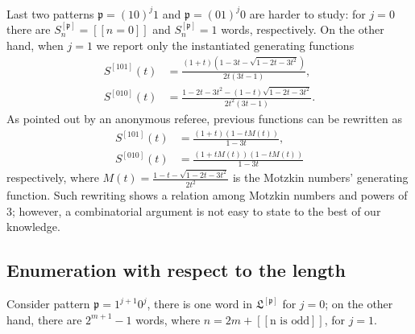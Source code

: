 Last two patterns $\mathfrak{p}=(10)^{j}1$ and $\mathfrak{p}=(01)^{j}0$ are
harder to study: for $j=0$ there are $S_{n}^{[\mathfrak{p}]}=[\![n=0]\!]$ and
$S_{n}^{[\mathfrak{p}]}=1$ words, respectively.  On the other hand, when $j=1$
we report only the instantiated generating functions
\begin{displaymath}
\begin{split}
    S^{[\mathfrak{101}]}(t) &=\frac{(1+t)\left(1-3t-\sqrt{1-2t-3t^{2}}\right)}{2t(3t-1)}, \\
    S^{[\mathfrak{010}]}(t) &=\frac{1-2t-3t^{2}-(1-t)\sqrt{1-2t-3t^{2}}}{2t^{2}(3t-1)}.
\end{split}
\end{displaymath}
As pointed out by an anonymous referee, previous functions can be rewritten as
\begin{displaymath}
\begin{split}
    S^{[\mathfrak{101}]}(t) &=\frac{(1+t)(1- t M(t))}{1-3t},\\
    S^{[\mathfrak{010}]}(t) &=\frac{(1+t M(t))(1-t M(t))}{1-3t}
\end{split}
\end{displaymath}
respectively, where $M(t)=\frac{1 - t - \sqrt{1-2t-3t^{2}} }{2t^{2}}$ is the
Motzkin numbers' generating function. Such rewriting shows a relation among Motzkin numbers
and powers of $3$; however, a combinatorial argument is not easy to state to
the best of our knowledge.

\subsection{Enumeration with respect to the length}

\begin{corollary}
Consider pattern $\mathfrak{p}=1^{j+1}0^{j}$, there is one word in
$\mathfrak{L}^{[\mathfrak{p}]}$ for $j=0$; on the other hand, there are
$2^{m+1}-1$ words, where $n=2m +  [\![\text{n is odd}]\!]$,  for $j=1$.
\end{corollary}

